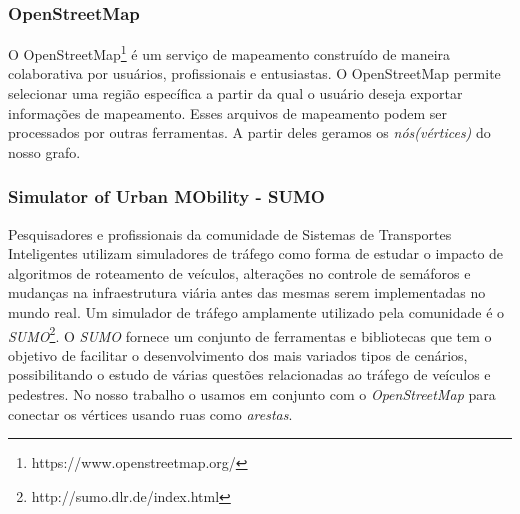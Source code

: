     \subsubsection{OpenStreetMap}
    O OpenStreetMap\footnote{https://www.openstreetmap.org/} é um serviço de mapeamento construído de maneira colaborativa por usuários, profissionais e entusiastas. O OpenStreetMap permite selecionar uma região específica a partir da qual o usuário deseja exportar informações de mapeamento. Esses arquivos de mapeamento podem ser processados por outras ferramentas. A partir deles geramos os \emph{nós(vértices)} do nosso grafo.
    
    \subsubsection{Simulator of Urban MObility - SUMO}
    Pesquisadores e profissionais da comunidade de Sistemas de Transportes Inteligentes utilizam simuladores de tráfego como forma de estudar o impacto de algoritmos de roteamento de veículos, alterações no controle de semáforos e mudanças na infraestrutura viária antes das mesmas serem implementadas no mundo real. Um simulador de tráfego amplamente utilizado pela comunidade é o \emph{SUMO}\footnote{http://sumo.dlr.de/index.html}. O \emph{SUMO} fornece um conjunto de ferramentas e bibliotecas que tem o objetivo de facilitar o desenvolvimento dos mais variados tipos de cenários, possibilitando o estudo de várias questões relacionadas ao tráfego de veículos e pedestres. No nosso trabalho o usamos em conjunto com o \emph{OpenStreetMap} para conectar os vértices usando ruas como \emph{arestas}.


